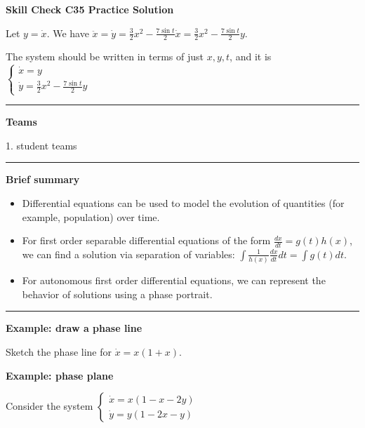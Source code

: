 \documentclass[12pt,letterpaper,noanswers]{exam}
\begin{document}
\noindent\textbf{Skill Check C35 Practice Solution}

Let $ y = \dot x$.  We have $\ddot x = \dot y = \frac{3}{2}x ^2- \frac{7\sin t}{2}\dot x = \frac{3}{2}x ^2- \frac{7\sin t}{2}y$.

The system should be written in terms of just $x,y,t$, and it is
$\displaystyle\left\{\begin{array}{l} \dot x = y \\ \dot y = \frac{3}{2}x^2 - \frac{7\sin t}{2}y
\end{array}\right.$

\vspace{0.2cm}
\hrule
\vspace{0.2cm}

\noindent\textbf{Teams}

\begin{multicols}{2}

1.  student teams
\end{multicols}


\vspace{0.2cm}
\hrule
\vspace{0.2cm}


\noindent\textbf{Brief summary}
\begin{tcolorbox}
\begin{itemize}
\itemsep0em
    \item Differential equations can be used to model the evolution of quantities (for example, population) over time.
    \item For first order separable differential equations of the form $\frac{dx}{dt} = g(t)h(x)$, we can find a solution via separation of variables: $\displaystyle\int \frac{1}{h(x)} \frac{dx}{dt} dt = \int g(t) dt$.
    \item For autonomous first order differential equations, we can represent the behavior of solutions using a phase portrait.
\end{itemize}
\end{tcolorbox}

\vspace{0.2cm}
\hrule
\vspace{0.2cm}


  \noindent\textbf{Example: draw a phase line}
  
  Sketch the phase line for $\dot x = x(1+x)$.
  \vspace{1in}
    
    \noindent\textbf{Example: phase plane}
    
    Consider the system $\left\{\begin{array}{l}\dot x = x(1-x-2y) \\
    \dot y = y(1-2x-y)\end{array}\right.$
    
\end{document}
